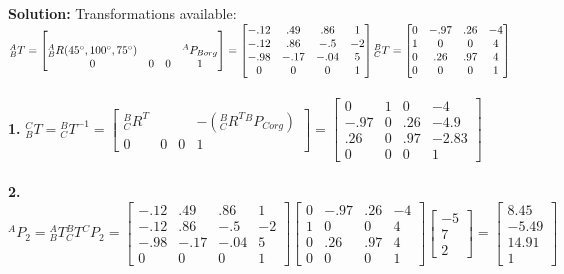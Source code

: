 \documentclass{article}
\begin{document}
\textbf{Solution: }
Transformations available:\\
${}^A_BT=\begin{bmatrix}
& & &\\
^A_BR(45^\circ,100^\circ,75^\circ) & & & {}^AP_{Borg}\\
0 & 0 & 0 & 1
\end{bmatrix}=\begin{bmatrix}
-.12 & .49 & .86 & 1\\
-.12 & .86 & -.5 & -2\\
-.98 & -.17 & -.04 & 5\\
0 & 0 & 0 & 1
\end{bmatrix}\\
{}^B_CT=\begin{bmatrix}
0 & -.97 & .26 & -4\\
1 & 0 & 0 & 4\\
0 & .26 & .97 & 4\\
0 & 0 & 0 & 1 
\end{bmatrix}$\\\\
\textbf{1. } ${}^C_BT={}^B_CT^{-1}=\begin{bmatrix}
{}^B_CR^T & & & -({}^B_CR^T{}^BP_{Corg}) \\
0 & 0 & 0 & 1
\end{bmatrix}=\begin{bmatrix}
0 & 1 & 0 & -4\\
-.97 & 0 & .26 & -4.9\\
.26 & 0 & .97 & -2.83\\
0 & 0 & 0 & 1
\end{bmatrix}$\\\\
\textbf{2. }
$^AP_2={}^A_BT{}^B_CT{}^CP_2=\begin{bmatrix}
-.12 & .49 & .86 & 1\\
-.12 & .86 & -.5 & -2\\
-.98 & -.17 & -.04 & 5\\
0 & 0 & 0 & 1
\end{bmatrix}\begin{bmatrix}
0 & -.97 & .26 & -4\\
1 & 0 & 0 & 4\\
0 & .26 & .97 & 4\\
0 & 0 & 0 & 1 
\end{bmatrix}\begin{bmatrix}
-5\\
7\\
2
\end{bmatrix}=\begin{bmatrix}
8.45\\
-5.49\\
14.91\\
1
\end{bmatrix}$\\\\
\end{document}
